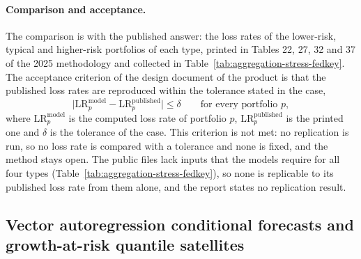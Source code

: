 \paragraph{Comparison and acceptance.}
The comparison is with the published answer: the loss rates of the lower-risk, typical and higher-risk portfolios of each type,
printed in Tables 22, 27, 32 and 37 of the 2025 methodology and collected in Table~\ref{tab:aggregation-stress-fedkey}. The
acceptance criterion of the design document of the product is that the published loss rates are reproduced within the tolerance
stated in the case,
\begin{equation}
\bigl\lvert\mathrm{LR}^{\mathrm{model}}_{p}-\mathrm{LR}^{\mathrm{published}}_{p}\bigr\rvert\le\delta\qquad\text{for every portfolio }p,
\label{eq:fed-accept}
\end{equation}
where $\mathrm{LR}^{\mathrm{model}}_{p}$ is the computed loss rate of portfolio $p$, $\mathrm{LR}^{\mathrm{published}}_{p}$ is the
printed one and $\delta$ is the tolerance of the case. This criterion is not met: no replication is run, so no
loss rate is compared with a tolerance and none is fixed, and the method stays open. The public files lack inputs that the models
require for all four types (Table~\ref{tab:aggregation-stress-fedkey}), so none is replicable to its published loss rate from
them alone, and the report states no replication result.

\subsection{Vector autoregression conditional forecasts and growth-at-risk quantile satellites}
\label{sec:m31}

